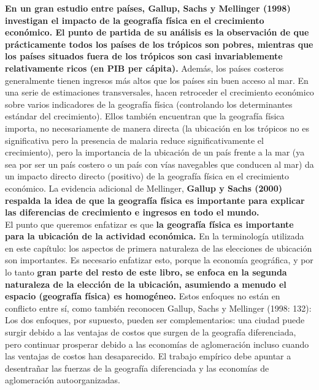 \textbf{En un gran estudio entre países, Gallup, Sachs y Mellinger (1998) investigan el impacto de la geografía física en el crecimiento económico. El punto de partida de su análisis es la observación de que prácticamente todos los países de los trópicos son pobres, mientras que los países situados fuera de los trópicos son casi invariablemente relativamente ricos (en PIB per cápita).} Además, los países costeros generalmente tienen ingresos más altos que los países sin buen acceso al mar. En una serie de estimaciones transversales, hacen retroceder el crecimiento económico sobre varios indicadores de la geografía física (controlando los determinantes estándar del crecimiento). Ellos también encuentran que la geografía física importa, no necesariamente de manera directa (la ubicación en los trópicos no es significativa pero la presencia de malaria reduce significativamente el crecimiento), pero la importancia de la ubicación de un país frente a la mar (ya sea por ser un país costero o un país con vías navegables que conducen al mar) da un impacto directo directo (positivo) de la geografía física en el crecimiento económico. La evidencia adicional de Mellinger, \textbf{Gallup y Sachs (2000) respalda la idea de que la geografía física es importante para explicar las diferencias de crecimiento e ingresos en todo el mundo.}\\
El punto que queremos enfatizar es que \textbf{la geografía física es importante para la ubicación de la actividad económica.} En la terminología utilizada en este capítulo: los aspectos de primera naturaleza de las elecciones de ubicación son importantes. Es necesario enfatizar esto, porque la economía geográfica, y por lo tanto \textbf{gran parte del resto de este libro, se enfoca en la segunda naturaleza de la elección de la ubicación, asumiendo a menudo el espacio (geografía física) es homogéneo.} Estos enfoques no están en conflicto entre sí, como también reconocen Gallup, Sachs y Mellinger (1998: 132): Los dos enfoques, por supuesto, pueden ser complementarios: una ciudad puede surgir debido a las ventajas de costos que surgen de la geografía diferenciada, pero continuar prosperar debido a las economías de aglomeración incluso cuando las ventajas de costos han desaparecido. El trabajo empírico debe apuntar a desentrañar las fuerzas de la geografía diferenciada y las economías de aglomeración autoorganizadas.

